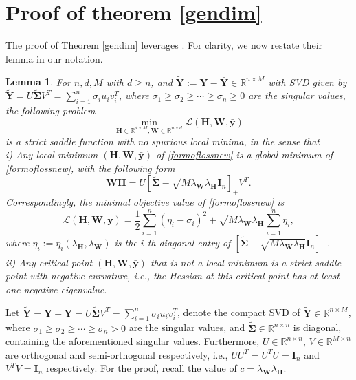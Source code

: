 \documentclass{article}
\theoremstyle{plain}
\newtheorem{lemma}[theorem]{Lemma}
\theoremstyle{definition}
\theoremstyle{remark}
\newcommand{\bW}{{\mathbf W}}
\newcommand{\bY}{{\mathbf Y}}
\newcommand{\bH}{{\mathbf H}}
\newcommand{\bI}{{\mathbf I}}
\newcommand{\byb}{{\bar{\mathbf y}}}
\newcommand{\bYb}{{\bar{\mathbf Y}}}
\newcommand{\bSigma}{{\mathbf \Sigma}}
\newcommand{\lH}{\lambda_{\bH}}
\newcommand{\lW}{\lambda_{\bW}}
\begin{document}
\section{Proof of theorem \ref{gendim}}
\label{sec:d_exp}
The proof of Theorem \ref{gendim} leverages \cite[Lemma B.1] {zhou2022optimization}. For clarity, we now restate their lemma in our notation.
\begin{lemma} \cite[Lemma B.1] {zhou2022optimization} \label{zhoulemma}
    For $n, d, M$ with $d\ge n$, and $\tilde{\bY}:=\bY-\bYb\in \mathbb{R}^{n\times M}$ with SVD given by 
    $\tilde{\bY}=U \tilde{\bSigma} V^T=\sum_{i=1}^n \sigma_i u_i v_i^T$, 
    where $\sigma_1\ge \sigma_2\ge \cdots \ge \sigma_n\ge 0$ are the singular values, the following problem
    \[
    \min_{\bH\in \mathbb{R}^{d\times M}, \bW \in \mathbb{R}^{n\times d}} \mathcal{L}(\bH, \bW, \byb)
    \]
    is a strict saddle function with no spurious local minima, in the sense that 
    \\
    i) Any local minimum $(\bH, \bW, \byb)$ of \eqref{formoflossnew} is a global minimum of \eqref{formoflossnew}, with the following form
    \[
    \bW \bH = U [\tilde{\bSigma}-\sqrt{M \lW \lH}\bI_n]_{+} V^T.
    \]
    Correspondingly, the minimal objective value of \eqref{formoflossnew} is 
    \[
    \mathcal{L}(\bH, \bW, \byb)= \frac{1}{2} \sum_{i=1}^n (\eta_i-\sigma_i)^2 + \sqrt{M \lW \lH} \sum_{i=1}^n \eta_i,
    \]
    where $\eta_i:=\eta_i(\lH, \lW)$ is the $i$-th diagonal entry of $[\tilde{\bSigma}-\sqrt{M \lW \lH} \bI_n]_{+}$.
    \\
    ii) Any critical point $(\bH, \bW, \byb)$ that is not a local minimum is a strict saddle point with negative curvature, i.e., the Hessian at this critical point has at least one negative eigenvalue.
\end{lemma}

Let $\tilde{\bY}=\bY-\bYb=U \tilde{\bSigma} V^T=\sum_{i=1}^n \sigma_i u_i v_i^T$, denote the compact SVD of $\tilde{\bY}\in \mathbb{R}^{n\times M}$, where $\sigma_1\ge \sigma_2\ge \cdots \ge \sigma_n > 0$ are the singular values, and $\tilde{\bSigma}\in \mathbb{R}^{n\times n}$ is diagonal, containing the aforementioned singular values. Furthermore, $U\in \mathbb{R}^{n\times n}$, $V\in \mathbb{R}^{M\times n}$ are orthogonal and semi-orthogonal respectively, i.e., $U U^T=U^TU=\bI_n$ and $V^T V=\bI_n$ respectively. For the proof, recall the value of $c=\lW \lH$.
\end{document}
